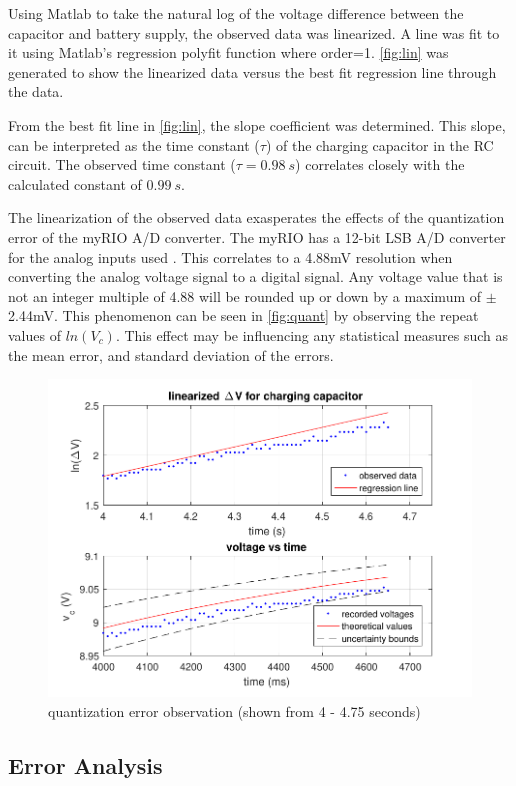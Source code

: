 \documentclass[10pt,twocolumn]{article}
\begin{document}
Using Matlab to take the natural log of the voltage difference between the capacitor and battery supply, the observed data was linearized. A line was fit to it using Matlab's regression polyfit function where order=1. \autoref{fig:lin} was generated to show the linearized data versus the best fit regression line through the data.

From the best fit line in \autoref{fig:lin}, the slope coefficient was determined. This slope, can be interpreted as the time constant ($\tau$) of the charging capacitor in the RC circuit. The observed time constant ($\tau = 0.98\ s$) correlates closely with the calculated constant of $0.99\ s$.  

The linearization of the observed data exasperates the effects of the quantization error of the myRIO A/D converter. The myRIO has a 12-bit LSB A/D converter for the analog inputs used \citep{NI2017}. This correlates to a 4.88mV resolution when converting the analog voltage signal to a digital signal. Any voltage value that is not an integer multiple of 4.88 will be rounded up or down by a maximum of $\pm$ 2.44mV.  This phenomenon can be seen in \autoref{fig:quant} by observing the repeat values of $ln(V_c)$. This effect may be influencing any statistical measures such as the mean error, and standard deviation of the errors.
  
\begin{figure}[hbt]
	\centering
	\includegraphics[width=.9\linewidth]{figures/quant.pdf}
	\caption{quantization error observation (shown from 4 - 4.75 seconds) }
	\label{fig:quant}
\end{figure}


\subsection{Error Analysis}
\end{document}
